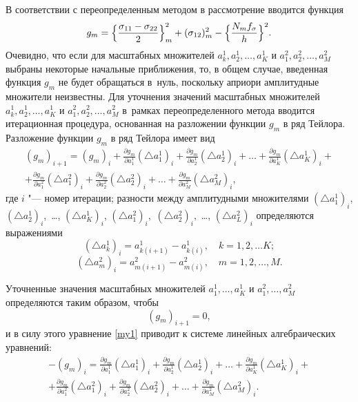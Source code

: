 В соответствии с переопределенным методом в рассмотрение  вводится функция
\begin{equation}
g_m=\Bigl\{\frac{\sigma_{11}-\sigma_{22}}{2}\Bigr\}^{2}_m+(\sigma_{12})^{2}_m-\Bigl\{\frac{N_mf_\sigma}{h}\Bigr\}^2.
\end{equation}
Очевидно, что если для масштабных множителей $a^1_k, a^1_2, \dots, a^1_K$ и $a^2_1, a^2_2, \dots, a^2_M$  выбраны некоторые начальные приближения, то, в общем случае, введенная функция $g_m$ не будет обращаться в~нуль, поскольку априори амплитудные множители неизвестны. 
Для уточнения значений масштабных множителей $a^1_k, a^1_2, \dots, a^1_K$ и $a^2_1, a^2_2, \dots, a^2_M$ в~рамках переопределенного  метода вводится итерационная процедура, основанная на разложении функции $g_m$ в ряд Тейлора. Разложение функции $g_m$ в ряд Тейлора имеет вид
\begin{multline}
(g_m)_{i+1}=(g_m)_i+\frac{\partial g_m}{\partial a_{1}^1}(\triangle a_{1}^1)_i+\frac{\partial g_m}{\partial a_{2}^1}(\triangle a_{2}^1)_i+ \dots +\frac{\partial g_m}{\partial a_{K}^1}(\triangle a_{K}^1)_i+ 
\\
+\frac{\partial g_m}{\partial a_{1}^2}(\triangle a_{1}^2)_i+\frac{\partial g_m}{\partial a_{2}^2}(\triangle a_{2}^2)_i+ \dots +\frac{\partial g_m}{\partial a_{M}^2}(\triangle a_{M}^2)_i, 
\label{my1}
\end{multline}
где $i$ "--- номер итерации;   разности между амплитудными множителями $(\triangle a_{1}^1)_i$, $(\triangle a_{2}^1)_i$,~\dots, $(\triangle a_{K}^1)_i$, $(\triangle a_{1}^2)_i,$ $(\triangle a_{2}^2)_i,$ \dots, $(\triangle a_{L}^2)_i$ определяются  выражениями   $$(\triangle a_{k}^1)_i=a^1_{k(i+1)}-a^1_{k(i)}, \quad k =1,2, \dots K;$$ $$(\triangle a_{m}^2)_i=a^2_{m(i+1)}-a^2_{m(i)}, \quad m =1, 2, \dots, M.$$

Уточненные значения масштабных множителей $a^1_1, \dots, a^1_K$ и $a^2_1, \dots, a^2_M$ определяются таким образом, чтобы 
$$(g_m)_{i+1}=0,$$ и в силу этого уравнение \eqref{my1} приводит к системе линейных алгебраических уравнений:
\begin{multline}
-(g_m)_i=\frac{\partial g_m}{\partial a^1_{1}}(\triangle a^1_{1})_i+\frac{\partial g_m}{\partial a^1_{2}}(\triangle a^1_{2})_i+\dots+\frac{\partial g_m}{\partial a^1_{K}}(\triangle a^1_{K})_i+ 
\\
+\frac{\partial g_m}{\partial a^2_{1}}(\triangle a^2_{1})_i+\frac{\partial g_m}{\partial a^2_{2}}(\triangle a^2_{2})_i+\dots +\frac{\partial g_m}{\partial a^2_{M}}(\triangle a^2_{M})_i.\label{my2}
\end{multline}

